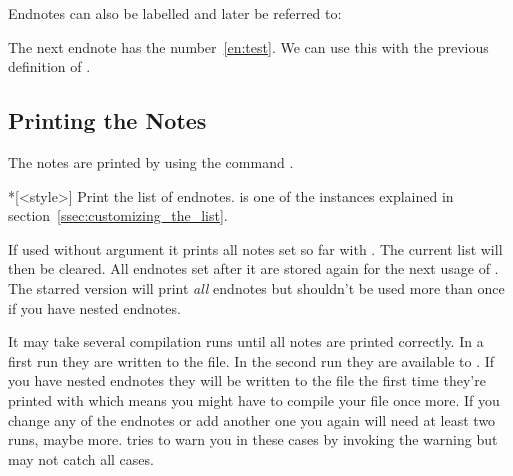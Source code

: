 \documentclass[toc=bib,toc=index]{cnpkgdoc}
\begin{document}
\makeatletter
\def\endnotemark{\@ifnextchar[{\@endnotemark}{\@endnotemark[\theendnote]}}%
\def\@endnotemark[#1]{\enotezwritemark{\enmarkstyle#1}}%
\makeatother

Endnotes can also be labelled and later be referred to:
\begin{beispiel}
 The next endnote\label{en:test}
 has the number~\ref{en:test}. We can use this with the previous definition
 of \string\endnotemark\endnotemark[\ref{en:test}].
\end{beispiel}

\subsection{Printing the Notes}
The notes are printed by using the command .
\begin{beschreibung}
 *[<style>]\newline
   Print the list of endnotes.  is one of the instances explained
   in section~\ref{ssec:customizing_the_list}.
\end{beschreibung}
If used without argument it prints all notes set so far with . The
current list will then be cleared. All endnotes set after it are stored again
for the next usage of . The starred version will print
\emph{all} endnotes but shouldn't be used more than once if you have nested
endnotes.

It may take several compilation runs until all notes are printed correctly. In
a first run they are written to the  file. In the second run they are
available to . If you have nested endnotes they will be written
to the  file the first time they're printed with 
which means you might have to compile your file once more. If you change any of
the endnotes or add another one you again will need at least two runs, maybe more.
\enotez tries to warn you in these cases by invoking the warning
but may not catch all cases.
\end{document}
